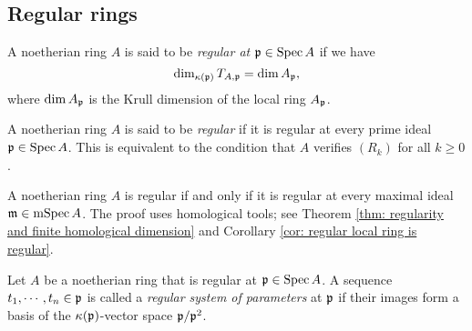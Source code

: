    
\subsection{Regular rings}





    \begin{definition}\label{def: regular ring}
        A noetherian ring \(A\) is said to be \emph{regular at \({\mathfrak{p}} \in \operatorname{Spec} A\)} if we have 
        \[ \dim_{{\kappa}({\mathfrak{p}})} T_{A,{\mathfrak{p}}} = \dim A_{\mathfrak{p}}, \]
        where \(\dim A_{\mathfrak{p}}\) is the Krull dimension of the local ring \(A_{\mathfrak{p}}\).
        
        A noetherian ring \(A\) is said to be \emph{regular} if it is regular at every prime ideal \({\mathfrak{p}} \in \operatorname{Spec} A\).
        This is equivalent to the condition that \(A\) verifies \((R_k)\) for all \(k \geq 0\).
    \end{definition}

    \begin{remark}\label{prop: regularity is a local property}
        A noetherian ring \(A\) is regular if and only if it is regular at every maximal ideal \({\mathfrak{m}} \in \operatorname{mSpec} A\). 
        The proof uses homological tools; see Theorem \ref{thm: regularity and finite homological dimension} and Corollary \ref{cor: regular local ring is regular}.
    \end{remark}

    \begin{definition}\label{def: regular system of parameters}
        Let \(A\) be a noetherian ring that is regular at \({\mathfrak{p}} \in \operatorname{Spec} A\).
        A sequence \(t_1,\cdots,t_n \in {\mathfrak{p}}\) is called a \emph{regular system of parameters} at \({\mathfrak{p}}\) if their images form a basis of the \({\kappa}({\mathfrak{p}})\)-vector space \({\mathfrak{p}}/{\mathfrak{p}}^2\).
    \end{definition}

